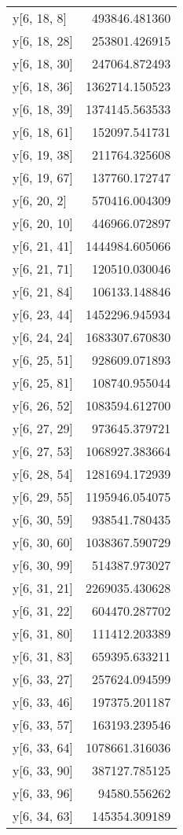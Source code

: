 \begin{longtable}{lr}
y[6, 18, 8] & 493846.481360 \\
y[6, 18, 28] & 253801.426915 \\
y[6, 18, 30] & 247064.872493 \\
y[6, 18, 36] & 1362714.150523 \\
y[6, 18, 39] & 1374145.563533 \\
y[6, 18, 61] & 152097.541731 \\
y[6, 19, 38] & 211764.325608 \\
y[6, 19, 67] & 137760.172747 \\
y[6, 20, 2] & 570416.004309 \\
y[6, 20, 10] & 446966.072897 \\
y[6, 21, 41] & 1444984.605066 \\
y[6, 21, 71] & 120510.030046 \\
y[6, 21, 84] & 106133.148846 \\
y[6, 23, 44] & 1452296.945934 \\
y[6, 24, 24] & 1683307.670830 \\
y[6, 25, 51] & 928609.071893 \\
y[6, 25, 81] & 108740.955044 \\
y[6, 26, 52] & 1083594.612700 \\
y[6, 27, 29] & 973645.379721 \\
y[6, 27, 53] & 1068927.383664 \\
y[6, 28, 54] & 1281694.172939 \\
y[6, 29, 55] & 1195946.054075 \\
y[6, 30, 59] & 938541.780435 \\
y[6, 30, 60] & 1038367.590729 \\
y[6, 30, 99] & 514387.973027 \\
y[6, 31, 21] & 2269035.430628 \\
y[6, 31, 22] & 604470.287702 \\
y[6, 31, 80] & 111412.203389 \\
y[6, 31, 83] & 659395.633211 \\
y[6, 33, 27] & 257624.094599 \\
y[6, 33, 46] & 197375.201187 \\
y[6, 33, 57] & 163193.239546 \\
y[6, 33, 64] & 1078661.316036 \\
y[6, 33, 90] & 387127.785125 \\
y[6, 33, 96] & 94580.556262 \\
y[6, 34, 63] & 145354.309189 \\

\end{longtable}
